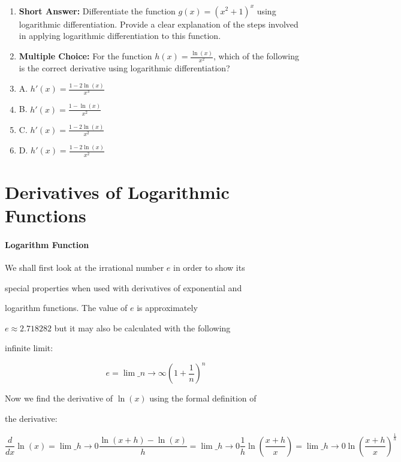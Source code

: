 \begin{enumerate}
    \item \textbf{Short Answer:} Differentiate the function $g(x) = (x^2 + 1)^x$ using logarithmic differentiation. Provide a clear explanation of the steps involved in applying logarithmic differentiation to this function.
    \item \textbf{Multiple Choice:} For the function $h(x) = \frac{\ln(x)}{x^2}$, which of the following is the correct derivative using logarithmic differentiation?
    \item A. $h'(x) = \frac{1 - 2 \ln(x)}{x^3}$
    \item B. $h'(x) = \frac{1 - \ln(x)}{x^2}$
    \item C. $h'(x) = \frac{1 - 2 \ln(x)}{x^2}$
    \item D. $h'(x) = \frac{1 - 2 \ln(x)}{x^2}$
\end{enumerate}

\section{Derivatives of Logarithmic Functions}
\label{sec:derivatives-of-logarithmic-functions}

\paragraph{Logarithm Function}



We shall first look at the irrational number $e$ in order to show its

special properties when used with derivatives of exponential and

logarithm functions. The value of $e$ is approximately

$e\approx2.718282$ but it may also be calculated with the following

infinite limit:



$$e=\lim\_{n\to\infty}\left(1+\frac{1}{n}\right)^n$$



Now we find the derivative of $\ln(x)$ using the formal definition of

the derivative:



$$\frac{d}{dx}\ln(x)=\lim\_{h\to0}\frac{\ln(x+h)-\ln(x)}{h}=\lim\_{h\to0}\frac{1}{h}\ln\left(\frac{x+h}{x}\right)=\lim\_{h\to0}\ln\left(\frac{x+h}{x}\right)^\frac{1}{h}$$



